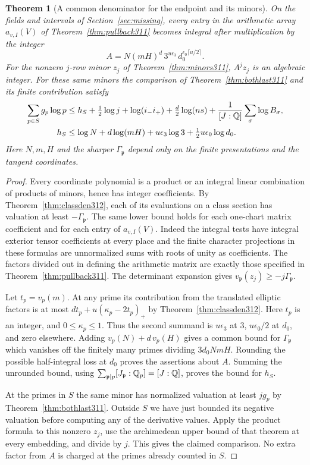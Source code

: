 \documentclass[a4paper,11pt]{article}
\newtheorem{theorem}[proposition]{Theorem}
\theoremstyle{definition}
\theoremstyle{remark}
\numberwithin{equation}{section}
\begin{document}
\begin{theorem}[A common denominator for the endpoint and its minors]\leavevmode
\label{thm:periodden312}
On the fields and intervals of Section~\ref{sec:missing}, every
entry in the arithmetic array \(a_{v,I}(V)\) of
Theorem~\ref{thm:pullback311} becomes integral after multiplication
by the integer
\[
       A=N(mH)^d\,3^{u\epsilon_3}\,
                          d_0^{\epsilon_0\lceil u/2\rceil}.
\]
For the nonzero \(j\)-row minor \(z_j\) of
Theorem~\ref{thm:minors311}, \(A^jz_j\) is an algebraic integer.
For these same minors the comparison of
Theorem~\ref{thm:bothlast311} and its finite contribution satisfy
\[
 \begin{split}
  \sum_{p\in S}g_p\log p
  &\le h_S+\tfrac12\log j+\log(i_-i_+)
        +\tfrac d2\log(ns)
        +\frac1{[J:\mathbb Q]}\sum_\sigma\log B_\sigma,\\
  h_S&\le \log N+d\log(mH)+u\epsilon_3\log3
                             +\tfrac12u\epsilon_0\log d_0 .
 \end{split}
\]
Here \(N,m,H\) and the sharper \(\Gamma_{\mathfrak p}\) depend
only on the finite presentations and the tangent coordinates.
\end{theorem}
\begin{proof}
Every coordinate polynomial is a product or an integral linear
combination of products of minors, hence has integer coefficients.
By Theorem~\ref{thm:classden312}, each of its evaluations on a
class section has valuation at least \(-\Gamma_{\mathfrak p}\).
The same lower bound holds for each one-chart matrix coefficient
and for each entry of \(a_{v,I}(V)\). Indeed the integral tests
have integral exterior tensor coefficients at every place and the
finite character projections in these formulas are unnormalized
sums with roots of unity as coefficients. The factors divided out
in defining the arithmetic matrix are exactly those specified in
Theorem~\ref{thm:pullback311}. The determinant expansion gives
\(v_{\mathfrak p}(z_j)\ge-j\Gamma_{\mathfrak p}\).

Let \(t_p=v_p(m)\). At any prime its contribution from
the translated elliptic factors is at most
\(d t_p+u(\kappa_p-2t_p)_+\) by Theorem~\ref{thm:classden312}.
Here \(t_p\) is an integer, and \(0\le\kappa_p\le1\). Thus the
second summand is \(u\epsilon_3\) at \(3\),
\(u\epsilon_0/2\) at \(d_0\), and zero elsewhere.
Adding \(v_p(N)+d\,v_p(H)\) gives a common bound for
\(\Gamma_{\mathfrak p}\) which vanishes off the finitely many
primes dividing \(3d_0NmH\). Rounding the possible half-integral
loss at \(d_0\) proves the assertions about \(A\). Summing the
unrounded bound, using \(\sum_{\mathfrak p\mid p}
[J_{\mathfrak p}:\mathbb Q_p]=[J:\mathbb Q]\), proves the bound for \(h_S\).

At the primes in \(S\) the same minor has normalized valuation
at least \(jg_p\) by Theorem~\ref{thm:bothlast311}. Outside \(S\)
we have just bounded its negative valuation before computing any
of the derivative values. Apply the product formula to this
nonzero \(z_j\), use the archimedean upper bound of that theorem
at every embedding, and divide by \(j\). This gives the claimed
comparison. No extra factor from \(A\) is charged at the primes
already counted in \(S\).
\end{proof}
\end{document}

